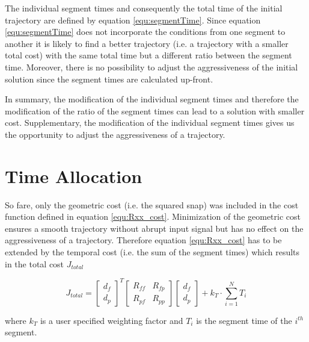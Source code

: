 The individual segment times and consequently the total time of the initial trajectory are defined by equation \ref{equ:segmentTime}. Since equation \ref{equ:segmentTime} does not incorporate the conditions from one segment to another it is likely to find a better trajectory (i.e. a trajectory with a smaller total cost) with the same total time but a different ratio between the segment time. Moreover, there is no possibility to adjust the aggressiveness of the initial solution since the segment times are calculated up-front. \newline

In summary, the modification of the individual segment times and therefore the modification of the ratio of the segment times can lead to a solution with smaller cost. Supplementary, the modification of the individual segment times gives us the opportunity to adjust the aggressiveness of a trajectory.



\section{Time Allocation}\label{sec:penalty}

So fare, only the geometric cost (i.e. the squared snap) was included in the cost function defined in equation \ref{equ:Rxx_cost}. Minimization of the geometric cost ensures a smooth trajectory without abrupt input signal but has no effect on the aggressiveness of a trajectory. Therefore equation \ref{equ:Rxx_cost} has to be extended by the temporal cost (i.e. the sum of the segment times) which results in the total cost $J_{total}$

\begin{equation}
J_{total} =
\begin{bmatrix}
   d_f \\
  d_p
\end{bmatrix}^T
\begin{bmatrix}
   R_{ff} & R_{fp} \\
  R_{pf} & R_{pp}
\end{bmatrix}
\begin{bmatrix}
   d_f \\
  d_p
\end{bmatrix}
+ k_T \cdot \sum_{i=1}^N T_i
\label{equ:total_cost}
\end{equation}

where $k_T$ is a user specified weighting factor and $T_i$ is the segment time of the $i^{th}$ segment. \newline

